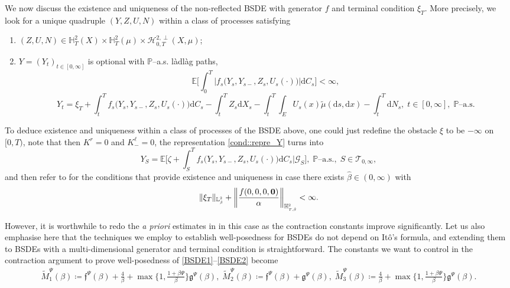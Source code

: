 \documentclass[10pt]{article} %
\newcommand\cG{\mathcal G}
\newcommand\cH{\mathcal H}
\newcommand\cT{\mathcal T}
\newcommand{\smalltext}[1]{\text{\fontsize{4}{4}\selectfont$#1$}}
\newcommand\ff{\mathfrak f}
\newcommand\fg{\mathfrak g}
\def \E{\mathbb{E}}
\def \H{\mathbb{H}}
\def \L{\mathbb{L}}
\def \P{\mathbb{P}}
\newcommand{\1}{\mathbf{1}}
\def\d{\mathrm{d}}
\begin{document}
We now discuss the existence and uniqueness of the non-reflected BSDE with generator $f$ and terminal condition $\xi_T$. More precisely, we look for a unique quadruple $(Y,Z,U,N)$ within a class of processes satisfying
\begin{enumerate}[{\bf (B1)}, leftmargin=0.9cm]
	\item\label{BSDE1} $(Z,U,N) \in \H^2_T(X) \times \H^2_T(\mu) \times \cH^{2,\perp}_{0,T}(X,\mu)$;
	\item\label{BSDE2} $Y = (Y_t)_{t \in [0,\infty]}$ is optional with $\P$--a.s. l\`adl\`ag paths,
		\begin{equation*}
			\E\bigg[\int_0^T \big|f_s\big(Y_s,Y_{s-},Z_s,U_s(\cdot)\big)\big|\d C_s\bigg] < \infty,
		\end{equation*}
		\begin{equation*}
			Y_t = \xi_T + \int_t^T f_s\big(Y_s,Y_{s-},Z_s,U_s(\cdot)\big) \d C_s - \int_t^T Z_s \d X_s - \int_t^T \int_E U_s(x)\tilde\mu(\d s, \d x) - \int_t^T \d N_s, \; t \in [0,\infty], \; \text{$\P$--a.s.}
		\end{equation*}
\end{enumerate}
To deduce existence and uniqueness within a class of processes of the BSDE above, one could just redefine the obstacle $\xi$ to be $-\infty$ on $[0,T)$, note that then $K^r = 0$ and $K^\ell_{-} = 0$, the representation \ref{cond::repre_Y} turns into
\begin{equation*}
	Y_S = \E\bigg[\zeta + \int_S^T f_s\big(Y_s,Y_{s-},Z_s,U_s(\cdot)\big)\d C_s\bigg| \cG_S\bigg], \; \text{$\P$--a.s.}, \; S \in \cT_{0,\infty},
\end{equation*}
and then refer to  for the conditions that provide existence and uniqueness in case there exists $\hat\beta \in (0,\infty)$ with
\begin{equation}\label{eq::integrability_bsde}
	\|\xi_T\|_{\L^\smalltext{2}_\smalltext{\hat\beta}} + \bigg\|\frac{f(0,0,0,\mathbf{0})}{\alpha}\bigg\|_{\H^\smalltext{2}_{\smalltext{T}\smalltext{,}\smalltext{\hat\beta}}} < \infty.
\end{equation}

However, it is worthwhile to redo the \emph{a priori} estimates in  in this case as the contraction constants improve significantly. Let us also emphasise here that the techniques we employ to establish well-posedness for BSDEs do not depend on It\^o's formula, and extending them to BSDEs with a multi-dimensional generator and terminal condition is straightforward. The constants we want to control in the contraction argument to prove well-posedness of \ref{BSDE1}--\ref{BSDE2} become
\begin{align*}\label{eq::tilde_pi_psi_1} %
	\widetilde M_1^\Psi(\beta) \coloneqq \ff^\Psi(\beta) + \frac{4}{\beta} + \max\bigg\{1,\frac{1+\beta\Psi}\beta\bigg\}\fg^\Psi(\beta),\;	\widetilde M_2^\Psi(\beta) \coloneqq \ff^\Psi(\beta) + \fg^\Psi(\beta),\;
	\widetilde M_3^\Psi(\beta) \coloneqq \frac{4}{\beta} + \max\bigg\{1,\frac{1+\beta\Psi}\beta\bigg\}\fg^\Psi(\beta).
\end{align*}
\end{document}

